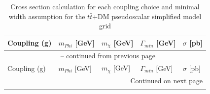 \begin{longtable}{lllll}
	\caption{Cross section calculation for each coupling choice and minimal width assumption for the $t\bar t$+DM pseudoscalar simplified model grid}\\
	\toprule
	Coupling (g) & $m_{Phi}$ [GeV] & $m_{\chi}$ [GeV] & $\Gamma_{min}$ [GeV] & $\sigma$ [pb]\\
	\midrule
	\endfirsthead
	
	\multicolumn{5}{c}{\tablename\ \thetable{} -- continued from previous page} \\
	Coupling (g) & $m_{Phi}$ [GeV] & $m_{\chi}$ [GeV] & $\Gamma_{min}$ [GeV] & $\sigma$ [pb]\\
	\midrule
	\endhead
	
	\midrule
	\multicolumn{5}{r}{{Continued on next page}} \\ 
	\endfoot
	

\end{longtable}
